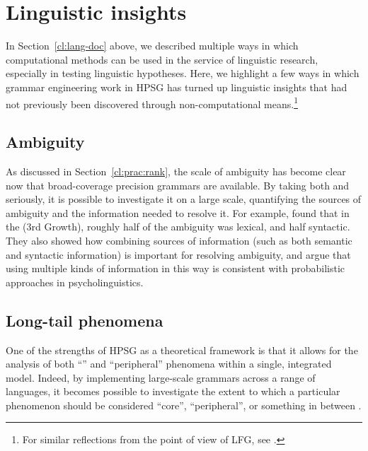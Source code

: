 \documentclass[output=paper
                ,modfonts
                ,nonflat
	        ,collection
	        ,collectionchapter
	        ,collectiontoclongg
 	        ,biblatex
                ,babelshorthands
                ,newtxmath
                ,draftmode
                ,colorlinks, citecolor=brown
]{./langsci/langscibook}
\begin{document}


\section{Linguistic insights}
\label{cl:insight}

In Section~\ref{cl:lang-doc} above, we described multiple ways in which computational methods can be used in the service of linguistic research, especially in testing linguistic hypotheses. Here, we highlight a few ways in which grammar engineering work in HPSG has turned up linguistic insights that had not previously been discovered through non-computational means.\footnote{For similar reflections from the point of view of LFG, see \cite{King:16}.}

\subsection{Ambiguity} %

As discussed in Section~\ref{cl:prac:rank},
the scale of ambiguity has become clear now that
broad-coverage precision grammars are available. 
By taking both  and  seriously,
it is possible to investigate it on a large scale,
quantifying the sources of ambiguity and the information needed to resolve it.
For example, \citet{Tou:Man:Shi:Fli:Oep:02,Tou:Man:Fli:Oep:05}
found that in the   (3rd Growth),
roughly half of the ambiguity was lexical, and half syntactic.
They also showed how combining sources of information
(such as both semantic and syntactic information)
is important for resolving ambiguity,
and argue that using multiple kinds of information in this way
is consistent with probabilistic approaches in psycholinguistics.

\subsection{Long-tail phenomena} %

One of the strengths of HPSG as a theoretical framework is that it allows for
the analysis of both ``'' and ``peripheral'' phenomena within a single, integrated model.
Indeed, by implementing large-scale grammars across a range of languages,
it becomes possible to investigate the extent to which
a particular phenomenon should be considered ``core'', ``peripheral'',
or something in between \citep{MuellerKernigkeit}.
\end{document}
